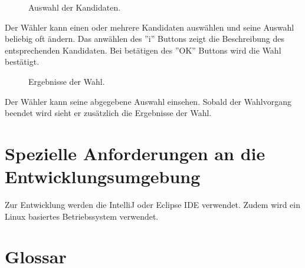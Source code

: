 \documentclass[parskip=full,11pt,twoside]{scrartcl}
\begin{document}
\begin{figure}[H]
	\caption{\label{fig:whlr-wahl}
		Auswahl der Kandidaten.
	}
\end{figure}
Der Wähler kann einen oder mehrere Kandidaten auswählen und seine Auswahl beliebig oft ändern.
Das anwählen des ''i'' Buttons zeigt die Beschreibung des entsprechenden Kandidaten.
Bei betätigen des ''OK'' Buttons wird die Wahl bestätigt.


\begin{figure}[H]
	\caption{\label{fig:whlr-result}
		Ergebnisse der Wahl.
	}
\end{figure}
Der Wähler kann seine abgegebene Auswahl einsehen.
Sobald der Wahlvorgang beendet wird sieht er zusätzlich die Ergebnisse der Wahl.

\section{Spezielle Anforderungen an die Entwicklungsumgebung}
Zur Entwicklung werden die IntelliJ oder Eclipse IDE verwendet.
Zudem wird ein \gls{Linux} basiertes Betriebssystem verwendet.

\section{Glossar}
\printglossaries
\end{document}
